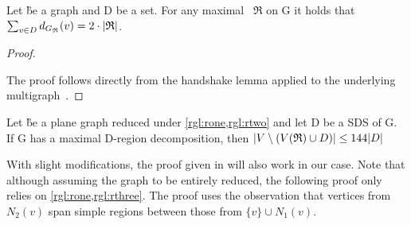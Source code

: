 \begin{corollary}
    Let \G be a graph and D be a set. For any maximal \dreg~$\mathfrak{R}$ on G it holds that $\sum_{v \in D} d_{G_{\mathfrak{R}}}(v) = 2 \cdot \abs{\mathfrak{R}}$.
\end{corollary}
\begin{proof}\label{lemma:polesBound}
    
    The proof follows directly from the handshake lemma applied to the underlying multigraph~\GR.
\end{proof}

\begin{proposition}\label{lemma:outside}
    Let \G be a plane graph reduced under \cref*{rgl:rone,rgl:rtwo} and let D be a SDS of G. If G has a maximal D-region decomposition, then $\abs{V \setminus (V(\mathfrak{R}) \cup D)} \leq 144 \abs{D}$
\end{proposition}

With slight modifications, the proof given in \cite[Revision 2014]{Garnero2018} will also work in our case. Note that although assuming the graph to be entirely reduced, the following proof only relies on \cref*{rgl:rone,rgl:rthree}. The proof uses the observation that vertices from $N_2(v)$ span simple regions between those from $\{v\} \cup N_1(v)$.

